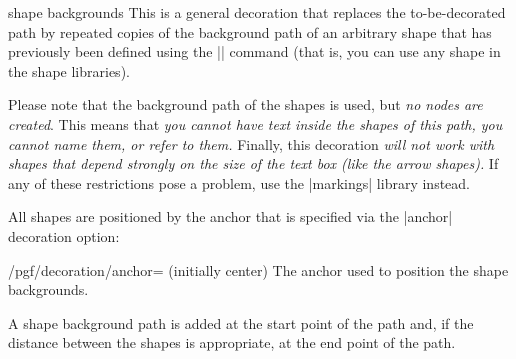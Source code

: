 \begin{decoration}{shape backgrounds}
    This is a general decoration that replaces the to-be-decorated path by
    repeated copies of the background path of an arbitrary shape that has
    previously been defined using the |\pgfdeclareshape| command (that is, you
    can use any shape in the shape libraries).

    Please note that the background path of the shapes is used, but \emph{no
    nodes are created}. This means that \emph{you cannot have text inside the
    shapes of this path, you cannot name them, or refer to them.} Finally, this
    decoration \emph{will not work with shapes that depend  strongly on the
    size of the text box (like the arrow shapes).} If any of these restrictions
    pose a problem, use the |markings| library instead.
\begin{codeexample}[preamble={\usetikzlibrary{decorations.shapes,shapes.geometric}}]
\end{codeexample}

\begin{codeexample}[preamble={\usetikzlibrary{decorations.shapes,shapes.geometric}}]
\end{codeexample}

    All shapes are positioned by the anchor that is specified via the |anchor|
    decoration option:

    \begin{key}{/pgf/decoration/anchor= (initially center)}
        The anchor used to position the shape backgrounds.
    \end{key}

    A shape background path is added at the start point of the path and, if the
    distance between the shapes is appropriate, at the end point of the path.
\begin{codeexample}[preamble={\usetikzlibrary{decorations.shapes,shapes.geometric}}]
\end{codeexample}


\end{decoration}
